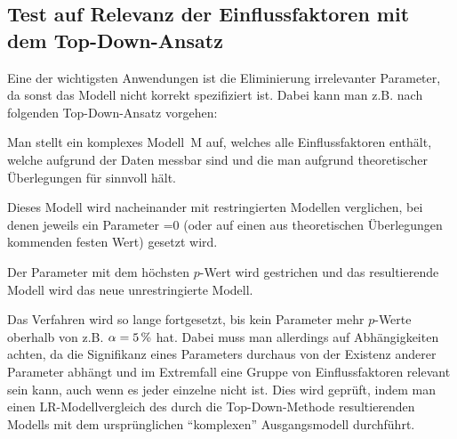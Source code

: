 \subsection{Test auf Relevanz der Einflussfaktoren mit dem Top-Down-Ansatz}
Eine der wichtigsten Anwendungen ist die Eliminierung irrelevanter
Parameter, da sonst das Modell nicht korrekt spezifiziert ist. Dabei
kann man z.B. nach folgenden Top-Down-Ansatz vorgehen:
\bi
\item Man stellt ein
komplexes Modell~M auf, welches alle Einflussfaktoren
enth\"alt, welche aufgrund der Daten messbar sind und die man aufgrund theoretischer
\"Uberlegungen f\"ur sinnvoll h\"alt. 
\item Dieses Modell wird
nacheinander mit restringierten Modellen verglichen, bei
denen jeweils ein Parameter =0 (oder auf einen aus theoretischen
\"Uberlegungen kommenden festen Wert)  gesetzt wird. 
\item Der Parameter
mit dem h\"ochsten $p$-Wert wird gestrichen und das resultierende
Modell wird das neue unrestringierte Modell. 
\item Das Verfahren wird so lange
fortgesetzt, bis kein Parameter mehr $p$-Werte oberhalb von
z.B. $\alpha=\unit[5]{\%}$ hat.
\ei
Dabei muss man allerdings auf Abh\"angigkeiten achten, da die
Signifikanz eines Parameters durchaus von der Existenz anderer
Parameter abh\"angt und im Extremfall eine Gruppe von
Einflussfaktoren relevant sein kann, auch wenn es jeder einzelne nicht
ist. Dies wird gepr\"uft, indem man einen LR-Modellvergleich  des
durch die Top-Down-Methode resultierenden
Modells mit dem urspr\"unglichen ``komplexen'' Ausgangsmodell durchf\"uhrt.





